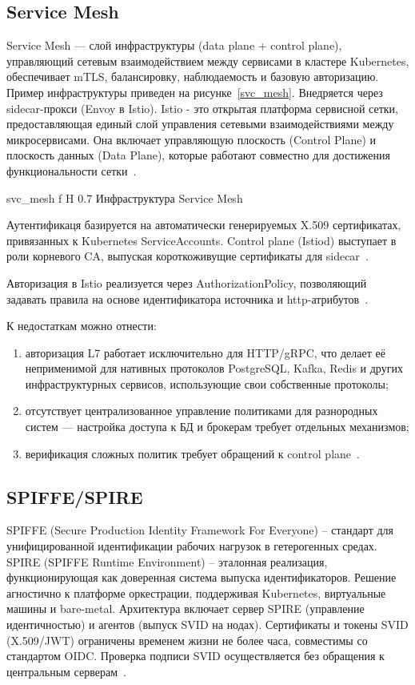 \subsection{Service Mesh}

Service Mesh --- слой инфраструктуры (data plane + control plane), управляющий сетевым взаимодействием между сервисами в кластере Kubernetes, обеспечивает mTLS, балансировку, наблюдаемость и базовую авторизацию. Пример инфраструктуры приведен на рисунке~\ref{svc_mesh}. Внедряется через sidecar-прокси (Envoy в Istio).
Istio - это открытая платформа сервисной сетки, предоставляющая единый слой управления сетевыми взаимодействиями между микросервисами. Она включает управляющую плоскость (Control Plane) и плоскость данных (Data Plane), которые работают совместно для достижения функциональности сетки~\cite{svc_mesh_cite}.

    {svc_mesh}
    {f}
    {H}
    {0.7\textwidth}
    {Инфраструктура Service Mesh}

Аутентификаця базируется на автоматически генерируемых X.509 сертификатах, привязанных к Kubernetes ServiceAccounts. Control plane (Istiod) выступает в роли корневого CA, выпуская короткоживущие сертификаты для sidecar~\cite{svcmesh_tls}.

Авторизация в Istio реализуется через AuthorizationPolicy, позволяющий задавать правила на основе идентификатора источника и http-атрибутов~\cite{svc_mesh_cite}.

К недостаткам можно отнести:
\begin{enumerate}
	\item авторизация L7 работает исключительно для HTTP/gRPC, что делает её неприменимой для нативных протоколов PostgreSQL, Kafka, Redis и других инфраструктурных сервисов, использующие свои собственные протоколы;
	\item отсутствует централизованное управление политиками для разнородных систем --- настройка доступа к БД и брокерам требует отдельных механизмов;
	\item верификация сложных политик требует обращений к control plane~\cite{svc_mesh_cite}.
\end{enumerate}

\subsection{SPIFFE/SPIRE}

SPIFFE (Secure Production Identity Framework For Everyone) – стандарт для унифицированной идентификации рабочих нагрузок в гетерогенных средах. SPIRE (SPIFFE Runtime Environment) – эталонная реализация, функционирующая как доверенная система выпуска идентификаторов. Решение агностично к платформе оркестрации, поддерживая Kubernetes, виртуальные машины и bare-metal. Архитектура включает сервер SPIRE (управление идентичностью) и агентов (выпуск SVID на нодах).
Сертификаты и токены SVID (X.509/JWT) ограничены временем жизни не более часа, совместимы со стандартом OIDC. Проверка подписи SVID осуществляется без обращения к центральным серверам~\cite{spiffe}. 

